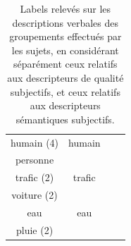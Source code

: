 \begin{table}[t]
\begin{tabular}{cc|cc}
humain (4)            & humain                  &                        &  \\  
personne              &                         &                        & \\       
\cline{1-2}
trafic (2)            & trafic                  &                        & \\
voiture (2)           &                         &                        &  \\                   
\cline{1-2}
eau                   & eau                     &                        & \\ 
pluie (2)             &                         &                        & \\
\end{tabular}
\vspace{0.5mm}
\caption{Labels relevés sur les descriptions verbales des groupements effectués par les sujets, en considérant séparément ceux relatifs aux descripteurs de qualité subjectifs, et ceux relatifs aux descripteurs sémantiques subjectifs.}
\label{tab:association}
\end{table}

